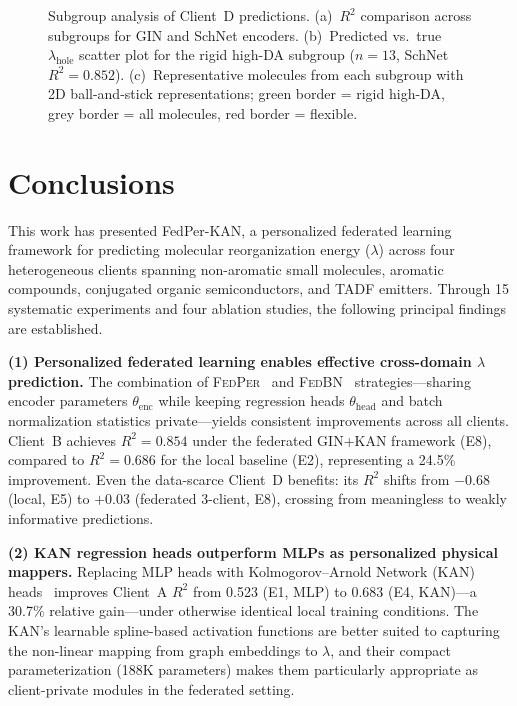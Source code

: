 \documentclass[twocolumn]{article}
\newcommand{\lam}{\lambda}
\newcommand{\lamhole}{\lambda_{\text{hole}}}
\newcommand{\thetaenc}{\theta_{\text{enc}}}
\newcommand{\thetahead}{\theta_{\text{head}}}
\newcommand{\Rsq}{R^{2}}
\newcommand{\FedPer}{\textsc{FedPer}}
\newcommand{\FedBN}{\textsc{FedBN}}
\begin{document}
\begin{figure}[h]
\centering
\caption{Subgroup analysis of Client~D predictions.
(a)~$\Rsq$ comparison across subgroups for GIN and SchNet encoders.
(b)~Predicted vs.\ true $\lamhole$ scatter plot for the rigid high-DA subgroup ($n = 13$, SchNet $\Rsq = 0.852$).
(c)~Representative molecules from each subgroup with 2D ball-and-stick representations; green border = rigid high-DA, grey border = all molecules, red border = flexible.}
\label{fig:subgroup}
\end{figure}

\section{Conclusions}\label{sec:conclusions}

This work has presented FedPer-KAN, a personalized federated learning framework for predicting molecular reorganization energy ($\lam$) across four heterogeneous clients spanning non-aromatic small molecules, aromatic compounds, conjugated organic semiconductors, and TADF emitters.
Through 15 systematic experiments and four ablation studies, the following principal findings are established.

\textbf{(1) Personalized federated learning enables effective cross-domain $\lam$ prediction.}
The combination of \FedPer{}~\cite{Arivazhagan2019_FedPer} and \FedBN{}~\cite{Li2021_FedBN} strategies---sharing encoder parameters $\thetaenc$ while keeping regression heads $\thetahead$ and batch normalization statistics private---yields consistent improvements across all clients.
Client~B achieves $\Rsq = 0.854$ under the federated GIN+KAN framework (E8), compared to $\Rsq = 0.686$ for the local baseline (E2), representing a 24.5\% improvement.
Even the data-scarce Client~D benefits: its $\Rsq$ shifts from $-0.68$ (local, E5) to $+0.03$ (federated 3-client, E8), crossing from meaningless to weakly informative predictions.

\textbf{(2) KAN regression heads outperform MLPs as personalized physical mappers.}
Replacing MLP heads with Kolmogorov--Arnold Network (KAN) heads~\cite{KAN2024} improves Client~A $\Rsq$ from 0.523 (E1, MLP) to 0.683 (E4, KAN)---a 30.7\% relative gain---under otherwise identical local training conditions.
The KAN's learnable spline-based activation functions are better suited to capturing the non-linear mapping from graph embeddings to $\lam$, and their compact parameterization (188K parameters) makes them particularly appropriate as client-private modules in the federated setting.
\end{document}
